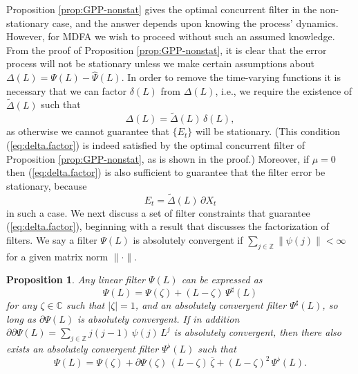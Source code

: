 \documentclass[a4paper]{book}
\def\ZZ{\mathbb Z}
\def\CC{\mathbb C}
\newtheorem{Proposition}{Proposition}
\begin{document}

 
\vspace{.5cm}

 Proposition  \ref{prop:GPP-nonstat} gives the optimal concurrent filter in 
  the non-stationary case, and the answer depends upon knowing the process'
   dynamics.  However, for MDFA we wish to proceed without such an assumed
   knowledge.   From the proof of Proposition  \ref{prop:GPP-nonstat}, it
  is clear that  the error process will  
 not be stationary unless we make certain assumptions
 about $\Delta (L) = \Psi (L) - \widehat{\Psi} (L)$.    
 In order to remove the time-varying functions it is necessary that 
 we can factor $\delta (L)$ from $\Delta (L)$, i.e., we require the existence of
 $\widetilde{\Delta } (L)$ such that
\begin{equation}
 \label{eq:delta.factor}
  \Delta (L) = \widetilde{\Delta } (L) \, \delta (L),
\end{equation}
 as otherwise we cannot guarantee that $\{ E_t \}$ will be stationary. 
 (This condition (\ref{eq:delta.factor}) is indeed satisfied by the optimal 
 concurrent filter of Proposition \ref{prop:GPP-nonstat}, as is shown in the 
  proof.)  Moreover, if $\mu =0$ then (\ref{eq:delta.factor}) is also 
  sufficient to guarantee
 that the filter error be stationary, because
\[
  E_t = \widetilde{\Delta} (L) \, \partial X_t
\]
 in such a case.   We next discuss a set of filter 
 constraints that guarantee (\ref{eq:delta.factor}), beginning with a result
 that discusses the factorization of filters.  
 We say a filter $\Psi (L)$ is absolutely convergent 
 if $\sum_{j \in \ZZ} \| \psi (j) \| < \infty$
 for a given matrix norm $\| \cdot \|$.

\begin{Proposition}
\label{prop:filter-decompose}
 Any linear filter $\Psi (L)$ can be expressed as
\[
  \Psi (L) = \Psi (\zeta) + (L - \zeta) \, \Psi^{\sharp} (L)
\]
 for any $\zeta \in \CC$  such that $| \zeta | = 1$,
  and an absolutely convergent filter $\Psi^{\sharp} (L)$,
  so long as  $\partial \Psi (L) $ is absolutely convergent.
 If in addition $ \partial \partial \Psi (L) =
 \sum_{ j \in \ZZ} j (j-1) \, \psi (j) \, L^j$
   is absolutely convergent, then there also exists an absolutely
   convergent filter $\Psi^{\flat} (L)$  such that
\[
 \Psi (L) = \Psi (\zeta) + \partial \Psi (\zeta) \, 
 (L- \zeta) \, \overline{\zeta} + {(L - \zeta)}^2 \, \Psi^{\flat} (L).
\]
\end{Proposition}
\end{document}
